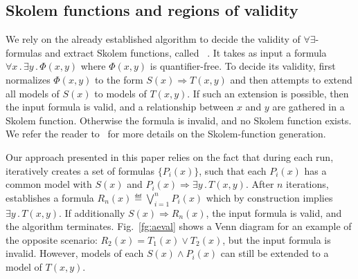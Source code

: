 \subsection{Skolem functions and regions of validity}
\label{sec:aeval}



We rely on the already established algorithm to decide the validity of $\forall\exists$-formulas and extract Skolem functions, called \aeval~\cite{fedyukovich2015automated}.
It takes as input a formula $\forall x \,.\, \exists y  \,.\, \Phi (x, y)$ where $\Phi (x, y)$ is quantifier-free.
To decide its validity, \aeval first normalizes $\Phi (x, y)$ to the form $S(x) \Rightarrow T(x, y)$ and then attempts to extend all models of $S(x)$ to models of $T(x,y)$.
If such an extension is possible, then the input formula is valid, and a relationship between $x$ and $y$ are gathered in a Skolem function.
Otherwise the formula is invalid, and no Skolem function exists.
We refer the reader to~\cite{KatisFGBGW16} for more details on the Skolem-function generation.

Our approach presented in this paper relies on the fact that during each run, \aeval iteratively creates a set of formulas $\{P_i(x)\}$, such that each $P_i(x)$ has a common model with $S(x)$ and $P_i(x) \Rightarrow \exists y \,.\,T (x,y)$.
After $n$ iterations, \aeval establishes a formula $R_n(x) \eqdef \bigvee_{i=1}^n P_i(x)$ which by construction implies $\exists y\,.\,T(x,y)$.
If additionally $S(x)\Rightarrow R_n(x)$, the input formula is valid, and the algorithm terminates.
%
Fig.~\ref{fg:aeval} shows a Venn diagram for an example of the opposite scenario: $R_2(x) = T_1(x) \lor T_2(x)$, but the input formula is invalid.
However, models of each $S(x) \land P_i(x)$ can still be extended to a model of $T(x, y)$.

